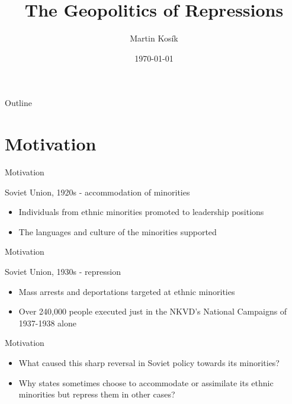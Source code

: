 \documentclass[11pt]{beamer}
\title{The Geopolitics of Repressions}
\date{\today}
\author{Martin Kosík}
\institute{Charles University}
\begin{document}
\begin{frame}
\titlepage
\end{frame}
\begin{frame}{Outline}
\tableofcontents
\end{frame}


\section{Motivation}
\begin{frame}{Motivation}
 \begin{block}{Soviet Union, 1920s -  accommodation of minorities}  {
\begin{itemize}
    \item Individuals from ethnic minorities  promoted to leadership positions 
    \item  The languages and culture of the minorities supported \citep{martin_affirmative_2001}
\end{itemize}}
\end{block} 
\end{frame}

\begin{frame}{Motivation}
 \begin{block}{Soviet Union, 1930s - repression}  {
\begin{itemize}
    \item Mass arrests and deportations targeted at ethnic minorities
    \item  Over 240,000 people executed just in the NKVD's National Campaigns of 1937-1938 alone \citep[p. 855]{martin_origins_1998}
\end{itemize}}
\end{block} 

\end{frame}

\begin{frame}{Motivation}
\begin{itemize}
    \item What caused this sharp reversal in Soviet policy towards its minorities?
    \item Why states sometimes choose to accommodate or assimilate its ethnic minorities but repress them in other cases?
\end{itemize}

\end{frame}
\end{document}
